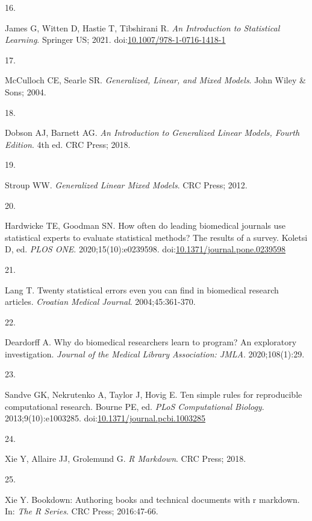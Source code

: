 \documentclass[smallextended]{svjour3}       %
\newlength{\cslhangindent}
\newlength{\csllabelwidth}
\newlength{\cslentryspacingunit} %
\newenvironment{CSLReferences}[2] %
 {%
  \setlength{\parindent}{0pt}
  \ifodd #1
  \let\oldpar\par
  \def\par{\hangindent=\cslhangindent\oldpar}
  \fi
  \setlength{\parskip}{#2\cslentryspacingunit}
 }%
 {}
\newcommand{\CSLLeftMargin}[1]{\parbox[t]{\csllabelwidth}{#1}}
\newcommand{\CSLRightInline}[1]{\parbox[t]{\linewidth - \csllabelwidth}{#1}\break}
\begin{document}
\begin{CSLReferences}{0}{0}
\leavevmode{}%
\CSLLeftMargin{16. }%
\CSLRightInline{James G, Witten D, Hastie T, Tibshirani R. \emph{An
Introduction to Statistical Learning}. Springer {US}; 2021.
doi:\href{https://doi.org/10.1007/978-1-0716-1418-1}{10.1007/978-1-0716-1418-1}}

\leavevmode{}%
\CSLLeftMargin{17. }%
\CSLRightInline{McCulloch CE, Searle SR. \emph{Generalized, Linear, and
Mixed Models}. John Wiley \& Sons; 2004.}

\leavevmode{}%
\CSLLeftMargin{18. }%
\CSLRightInline{Dobson AJ, Barnett AG. \emph{An Introduction to
Generalized Linear Models, Fourth Edition}. 4th ed. CRC Press; 2018.}

\leavevmode{}%
\CSLLeftMargin{19. }%
\CSLRightInline{Stroup WW. \emph{Generalized Linear Mixed Models}. CRC
Press; 2012.}

\leavevmode{}%
\CSLLeftMargin{20. }%
\CSLRightInline{Hardwicke TE, Goodman SN. How often do leading
biomedical journals use statistical experts to evaluate statistical
methods? The results of a survey. Koletsi D, ed. \emph{{PLOS} {ONE}}.
2020;15(10):e0239598.
doi:\href{https://doi.org/10.1371/journal.pone.0239598}{10.1371/journal.pone.0239598}}

\leavevmode{}%
\CSLLeftMargin{21. }%
\CSLRightInline{Lang T. Twenty statistical errors even you can find in
biomedical research articles. \emph{Croatian Medical Journal}.
2004;45:361-370.}

\leavevmode{}%
\CSLLeftMargin{22. }%
\CSLRightInline{Deardorff A. Why do biomedical researchers learn to
program? An exploratory investigation. \emph{Journal of the Medical
Library Association: JMLA}. 2020;108(1):29.}

\leavevmode{}%
\CSLLeftMargin{23. }%
\CSLRightInline{Sandve GK, Nekrutenko A, Taylor J, Hovig E. Ten simple
rules for reproducible computational research. Bourne PE, ed.
\emph{{PLoS} Computational Biology}. 2013;9(10):e1003285.
doi:\href{https://doi.org/10.1371/journal.pcbi.1003285}{10.1371/journal.pcbi.1003285}}

\leavevmode{}%
\CSLLeftMargin{24. }%
\CSLRightInline{Xie Y, Allaire JJ, Grolemund G. \emph{{R} Markdown}. CRC
Press; 2018.}

\leavevmode{}%
\CSLLeftMargin{25. }%
\CSLRightInline{Xie Y. Bookdown: Authoring books and technical documents
with r markdown. In: \emph{The {R} Series}. CRC Press; 2016:47-66.}

\end{CSLReferences}




\end{document}
